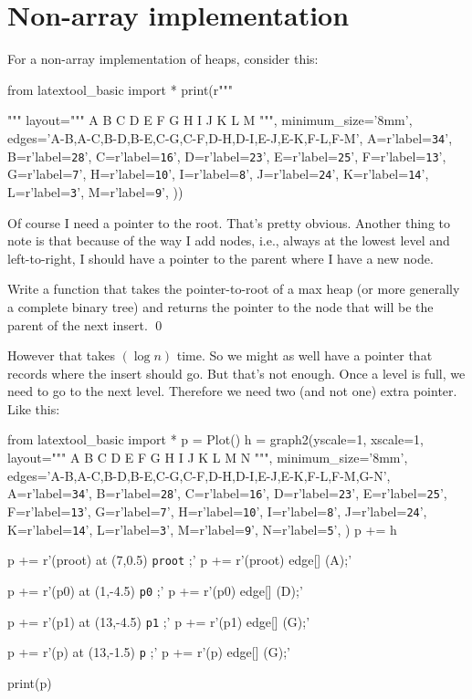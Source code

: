 \section{Non-array implementation}

For a non-array implementation of heaps,
consider this:

\begin{python}
from latextool_basic import *
print(r"""
\begin{center}
\end{center}
""" %
layout="""
        A 
    B       C 
  D   E   F   G
 H I J K L M 
""",
minimum_size='8mm',
edges='A-B,A-C,B-D,B-E,C-G,C-F,D-H,D-I,E-J,E-K,F-L,F-M',
A=r'label=\texttt{34}',
B=r'label=\texttt{28}',
C=r'label=\texttt{16}',
D=r'label=\texttt{23}',
E=r'label=\texttt{25}',
F=r'label=\texttt{13}',
G=r'label=\texttt{7}',
H=r'label=\texttt{10}',
I=r'label=\texttt{8}',
J=r'label=\texttt{24}',
K=r'label=\texttt{14}',
L=r'label=\texttt{3}',
M=r'label=\texttt{9}',
))
\end{python}

Of course I need a pointer to the root.
That's pretty obvious.
Another thing to note is that because of the way I add nodes,
i.e., always at the lowest level and left-to-right, I should have a pointer
to the parent where I have a new node.




\begin{ex}
  Write a function that takes the pointer-to-root of a
  max heap (or more generally a complete binary
  tree) and returns the pointer to the node that will be the parent
  of the next insert.
  \qed
\end{ex}

However that takes $(\log n)$ time.
So we might as well have a pointer that records where the
insert should go.
But that's not enough.
Once a level is full, we need to go to the next level.
Therefore we need two (and not one) extra pointer.
Like this:

\begin{python}
from latextool_basic import *
p = Plot()
h = graph2(yscale=1, xscale=1,
layout="""
        A 
    B       C 
  D   E   F   G
 H I J K L M N
""",
minimum_size='8mm',
edges='A-B,A-C,B-D,B-E,C-G,C-F,D-H,D-I,E-J,E-K,F-L,F-M,G-N',
A=r'label=\texttt{34}',
B=r'label=\texttt{28}',
C=r'label=\texttt{16}',
D=r'label=\texttt{23}',
E=r'label=\texttt{25}',
F=r'label=\texttt{13}',
G=r'label=\texttt{7}',
H=r'label=\texttt{10}',
I=r'label=\texttt{8}',
J=r'label=\texttt{24}',
K=r'label=\texttt{14}',
L=r'label=\texttt{3}',
M=r'label=\texttt{9}',
N=r'label=\texttt{5}',
)
p += h

p += r'\node (proot) at (7,0.5) {\texttt{proot}} ;'
p += r'\path [-triangle 60] (proot) edge[] (A);'

p += r'\node (p0) at (1,-4.5) {\texttt{p0}} ;'
p += r'\path [-triangle 60] (p0) edge[] (D);'

p += r'\node (p1) at (13,-4.5) {\texttt{p1}} ;'
p += r'\path [-triangle 60] (p1) edge[] (G);'

p += r'\node (p) at (13,-1.5) {\texttt{p}} ;'
p += r'\path [-triangle 60] (p) edge[] (G);'

print(p)
\end{python}

